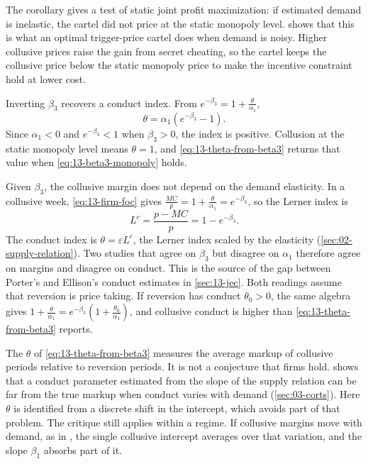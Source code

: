 The corollary gives a test of static joint profit maximization: if estimated demand is inelastic, the cartel did
not price at the static monopoly level.  shows that this is what an optimal trigger-price cartel
does when demand is noisy. Higher collusive prices raise the gain from secret cheating, so the cartel keeps the
collusive price below the static monopoly price to make the incentive constraint hold at lower cost.

Inverting $\beta_3$ recovers a conduct index. From $e^{-\beta_3} = 1 + \frac{\theta}{\alpha_1}$,
\begin{equation}\label{eq:13-theta-from-beta3}
  \theta = \alpha_1\left(e^{-\beta_3} - 1\right) .
\end{equation}
Since $\alpha_1 < 0$ and $e^{-\beta_3} < 1$ when $\beta_3 > 0$, the index is positive. Collusion at the static
monopoly level means $\theta = 1$, and \eqref{eq:13-theta-from-beta3} returns that value when
\eqref{eq:13-beta3-monopoly} holds.

\begin{remark}\label{rem:13-lerner-vs-theta}
Given $\beta_3$, the collusive margin does not depend on the demand elasticity. In a collusive week,
\eqref{eq:13-firm-foc} gives $\frac{MC}{p} = 1 + \frac{\theta}{\alpha_1} = e^{-\beta_3}$, so the Lerner index is
\begin{equation}\label{eq:13-lerner-beta3}
  L^{c} = \frac{p - MC}{p} = 1 - e^{-\beta_3}.
\end{equation}
The conduct index is $\theta = \varepsilon L^{c}$, the Lerner index scaled by the elasticity
(\cref{sec:02-supply-relation}). Two studies that agree on $\beta_3$ but disagree on $\alpha_1$ therefore agree on
margins and disagree on conduct. This is the source of the gap between Porter's and Ellison's conduct estimates in
\cref{sec:13-jec}. Both readings assume that reversion is price taking. If reversion has conduct $\theta_0 > 0$, the
same algebra gives $1 + \frac{\theta}{\alpha_1} = e^{-\beta_3}\left(1 + \frac{\theta_0}{\alpha_1}\right)$, and
collusive conduct is higher than \eqref{eq:13-theta-from-beta3} reports.
\end{remark}

\begin{remark}\label{rem:13-corts}
The $\theta$ of \eqref{eq:13-theta-from-beta3} measures the average markup of collusive periods relative to
reversion periods. It is not a conjecture that firms hold.  shows that a conduct parameter
estimated from the slope of the supply relation can be far from the true markup when conduct varies with demand
(\cref{sec:03-corts}). Here $\theta$ is identified from a discrete shift in the intercept, which avoids part of
that problem. The critique still applies within a regime. If collusive margins move with demand, as in
\citet{RotembergSaloner1986}, the single collusive intercept averages over that variation, and the slope $\beta_1$
absorbs part of it.
\end{remark}


